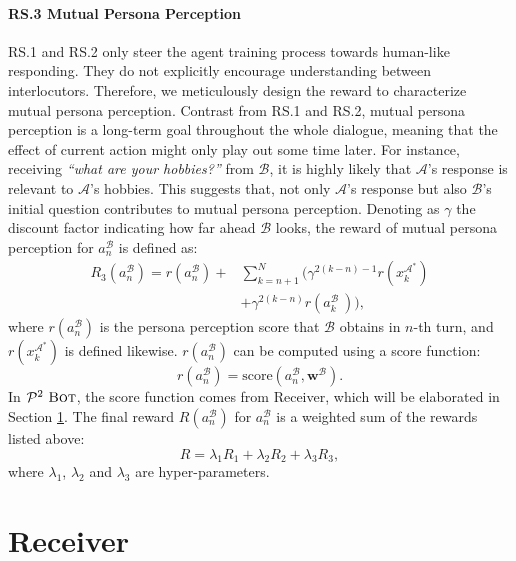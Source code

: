 \documentclass[11pt,a4paper]{article}
\begin{document}
\paragraph{RS.3 Mutual Persona Perception} 
RS.1 and RS.2 only steer the agent training process towards human-like responding. They do not explicitly encourage understanding between interlocutors. Therefore, we meticulously design the reward to characterize mutual persona perception. 
Contrast from RS.1 and RS.2, mutual persona perception is a long-term goal throughout the whole dialogue, 
meaning that the effect of current action might only play out some time later. 
For instance, receiving \textit{``what are your hobbies?''} from $\mathcal{B}$, it is highly likely that $\mathcal{A}$'s response is relevant to $\mathcal{A}$'s hobbies. 
This suggests that, not only $\mathcal{A}$'s response but also $\mathcal{B}$'s initial question contributes to mutual persona perception. 
Denoting as $\gamma$ the discount factor indicating how far ahead $\mathcal{B}$ looks, the reward of mutual persona perception for $a^\mathcal{B}_n$ is defined as:
\begin{equation}\label{eq:r_3}
    \begin{aligned}
        R_3(a^\mathcal{B}_n)\!=r(a^\mathcal{B}_n)+&\!\sum\limits_{k=n+1}^{N}\!\!\Big({\gamma}^{2(k-n)-1}r(x^\mathcal{A^*}_k)\\
        &+{\gamma}^{2(k-n)}r(a^\mathcal{B}_k~) \Big),
    \end{aligned}
\end{equation}
where $r(a^\mathcal{B}_n)$ is the persona perception score that $\mathcal{B}$ obtains in $n$-th turn, and $r(x^\mathcal{A^*}_k)$ is defined likewise. $r(a^\mathcal{B}_n)$ can be computed using a score function:
\begin{equation}\label{eq:r_3_score}
    r(a^\mathcal{B}_n) = \text{score}(a^\mathcal{B}_n, \mathbf{w}^{\mathcal{B}}).
\end{equation}
In $\mathcal{P}^2~\textsc{Bot}$, the score function comes from Receiver, which will be elaborated in Section \ref{sec-receiver}. The final reward $R(a^\mathcal{B}_n)$ for $a^\mathcal{B}_n$ is a weighted sum of the rewards listed above:
\begin{equation}
    R = \lambda_{1}R_1 + \lambda_{2}R_2 + \lambda_{3}R_3,
\end{equation}
where $\lambda_{1}$, $\lambda_{2}$ and $\lambda_{3}$ are hyper-parameters.

\section{Receiver}
\label{sec-receiver}
\end{document}
